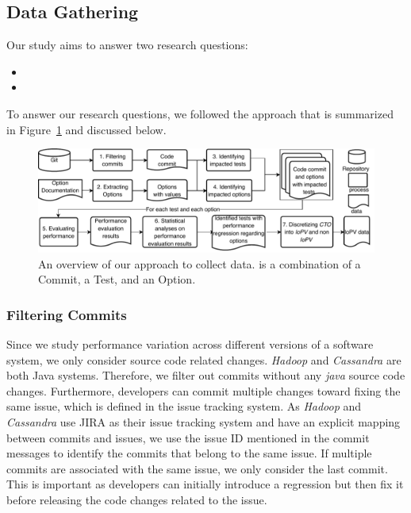 \subsection{Data Gathering}
Our study aims to answer two research questions: 
\begin{itemize}
    \item \RQII
    \item \RQIII
\end{itemize}

To answer our research questions, we followed the approach that is summarized in Figure~\ref{fig:overview} and discussed below.

\begin{figure}[t]
	\centering
		\includegraphics[width=.9\textwidth]{Figures/overview.pdf}
	\caption{An overview of our approach to collect data. \instance is a combination of a Commit, a Test, and an Option.} %
	\label{fig:overview} 
\end{figure}

\subsubsection{Filtering Commits}

Since we study performance variation across different versions of a software system, we only consider source code related changes. \emph{Hadoop} and \emph{Cassandra} are both Java systems. Therefore, we filter out commits without any \emph{java} source code changes. %
Furthermore, %
developers can commit multiple changes toward fixing the same issue, which is defined in the issue tracking system. As \emph{Hadoop} and \emph{Cassandra} use JIRA as their issue tracking system and have an explicit mapping between commits and issues, we use the issue ID mentioned in the commit messages to identify the commits that belong to the same issue. If multiple commits are associated with the same issue, we only consider the last commit. This is important as developers can initially introduce a regression but then fix it before releasing the code changes related to the issue. %


